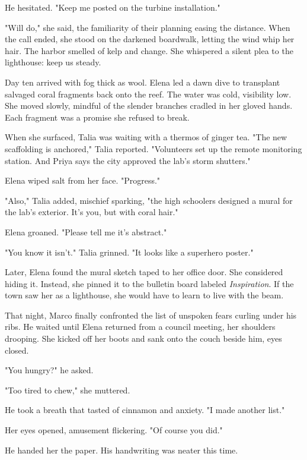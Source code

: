 He hesitated. "Keep me posted on the turbine installation."

"Will do," she said, the familiarity of their planning easing the distance. When the call ended, she stood on the darkened boardwalk, letting the wind whip her hair. The harbor smelled of kelp and change. She whispered a silent plea to the lighthouse: keep us steady.

\bigskip

Day ten arrived with fog thick as wool. Elena led a dawn dive to transplant salvaged coral fragments back onto the reef. The water was cold, visibility low. She moved slowly, mindful of the slender branches cradled in her gloved hands. Each fragment was a promise she refused to break.

When she surfaced, Talia was waiting with a thermos of ginger tea. "The new scaffolding is anchored," Talia reported. "Volunteers set up the remote monitoring station. And Priya says the city approved the lab's storm shutters."

Elena wiped salt from her face. "Progress."

"Also," Talia added, mischief sparking, "the high schoolers designed a mural for the lab's exterior. It's you, but with coral hair."

Elena groaned. "Please tell me it's abstract."

"You know it isn't." Talia grinned. "It looks like a superhero poster."

Later, Elena found the mural sketch taped to her office door. She considered hiding it. Instead, she pinned it to the bulletin board labeled \textit{Inspiration}. If the town saw her as a lighthouse, she would have to learn to live with the beam.

\bigskip

That night, Marco finally confronted the list of unspoken fears curling under his ribs. He waited until Elena returned from a council meeting, her shoulders drooping. She kicked off her boots and sank onto the couch beside him, eyes closed.

"You hungry?" he asked.

"Too tired to chew," she muttered.

He took a breath that tasted of cinnamon and anxiety. "I made another list."

Her eyes opened, amusement flickering. "Of course you did."

He handed her the paper. His handwriting was neater this time.

